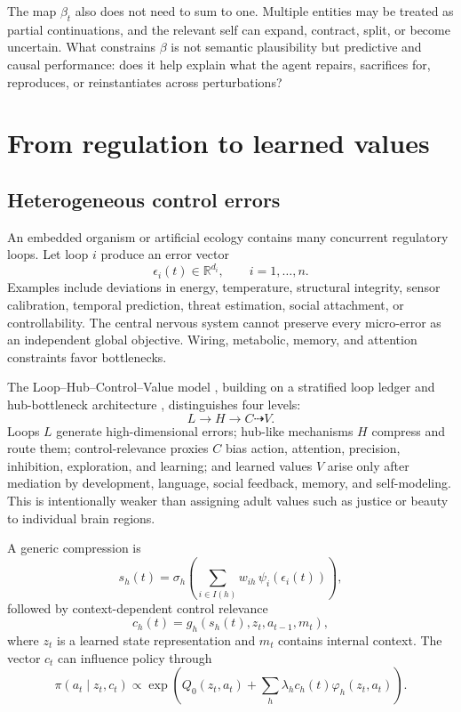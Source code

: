 \documentclass[11pt]{article}
\newcommand{\R}{\mathbb{R}}
\begin{document}
The map $\beta_t$ also does not need to sum to one. Multiple entities may be treated as partial continuations, and the relevant self can expand, contract, split, or become uncertain. What constrains $\beta$ is not semantic plausibility but predictive and causal performance: does it help explain what the agent repairs, sacrifices for, reproduces, or reinstantiates across perturbations?

\section{From regulation to learned values}

\subsection{Heterogeneous control errors}

An embedded organism or artificial ecology contains many concurrent regulatory loops. Let loop $i$ produce an error vector
\begin{equation}
\epsilon_i(t)\in\R^{d_i},
\qquad i=1,\ldots,n.
\end{equation}
Examples include deviations in energy, temperature, structural integrity, sensor calibration, temporal prediction, threat estimation, social attachment, or controllability. The central nervous system cannot preserve every micro-error as an independent global objective. Wiring, metabolic, memory, and attention constraints favor bottlenecks.

The Loop--Hub--Control--Value model \citep{zarncke2026lhcv}, building on a stratified loop ledger \citep{zarncke2025stratification} and hub-bottleneck architecture \citep{zarncke2025lhv}, distinguishes four levels:
\begin{equation}
L\longrightarrow H\longrightarrow C\dashrightarrow V.
\label{eq:lhcv}
\end{equation}
Loops $L$ generate high-dimensional errors; hub-like mechanisms $H$ compress and route them; control-relevance proxies $C$ bias action, attention, precision, inhibition, exploration, and learning; and learned values $V$ arise only after mediation by development, language, social feedback, memory, and self-modeling. This is intentionally weaker than assigning adult values such as justice or beauty to individual brain regions.

A generic compression is
\begin{equation}
s_h(t)
=
\sigma_h\!\left(
\sum_{i\in I(h)} w_{ih}\,\psi_i(\epsilon_i(t))
\right),
\label{eq:hub-compression}
\end{equation}
followed by context-dependent control relevance
\begin{equation}
c_h(t)=g_h(s_h(t),z_t,a_{t-1},m_t),
\label{eq:control-relevance}
\end{equation}
where $z_t$ is a learned state representation and $m_t$ contains internal context. The vector $c_t$ can influence policy through
\begin{equation}
\pi(a_t\mid z_t,c_t)
\propto
\exp\!\left(
Q_0(z_t,a_t)
+
\sum_h \lambda_h c_h(t)\varphi_h(z_t,a_t)
\right).
\label{eq:proxy-policy}
\end{equation}
\end{document}
